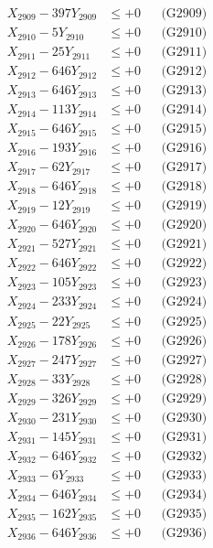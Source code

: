 \documentclass[a4paper,10pt]{article}
\begin{document}
{\begin{align}
X_{2909} - 397Y_{2909} &\leq +0 && \text{(G2909)} \\
X_{2910} - 5Y_{2910} &\leq +0 && \text{(G2910)} \\
\allowbreak
X_{2911} - 25Y_{2911} &\leq +0 && \text{(G2911)} \\
X_{2912} - 646Y_{2912} &\leq +0 && \text{(G2912)} \\
X_{2913} - 646Y_{2913} &\leq +0 && \text{(G2913)} \\
X_{2914} - 113Y_{2914} &\leq +0 && \text{(G2914)} \\
X_{2915} - 646Y_{2915} &\leq +0 && \text{(G2915)} \\
X_{2916} - 193Y_{2916} &\leq +0 && \text{(G2916)} \\
X_{2917} - 62Y_{2917} &\leq +0 && \text{(G2917)} \\
X_{2918} - 646Y_{2918} &\leq +0 && \text{(G2918)} \\
X_{2919} - 12Y_{2919} &\leq +0 && \text{(G2919)} \\
X_{2920} - 646Y_{2920} &\leq +0 && \text{(G2920)} \\
\allowbreak
X_{2921} - 527Y_{2921} &\leq +0 && \text{(G2921)} \\
X_{2922} - 646Y_{2922} &\leq +0 && \text{(G2922)} \\
X_{2923} - 105Y_{2923} &\leq +0 && \text{(G2923)} \\
X_{2924} - 233Y_{2924} &\leq +0 && \text{(G2924)} \\
X_{2925} - 22Y_{2925} &\leq +0 && \text{(G2925)} \\
X_{2926} - 178Y_{2926} &\leq +0 && \text{(G2926)} \\
X_{2927} - 247Y_{2927} &\leq +0 && \text{(G2927)} \\
X_{2928} - 33Y_{2928} &\leq +0 && \text{(G2928)} \\
X_{2929} - 326Y_{2929} &\leq +0 && \text{(G2929)} \\
X_{2930} - 231Y_{2930} &\leq +0 && \text{(G2930)} \\
\allowbreak
X_{2931} - 145Y_{2931} &\leq +0 && \text{(G2931)} \\
X_{2932} - 646Y_{2932} &\leq +0 && \text{(G2932)} \\
X_{2933} - 6Y_{2933} &\leq +0 && \text{(G2933)} \\
X_{2934} - 646Y_{2934} &\leq +0 && \text{(G2934)} \\
X_{2935} - 162Y_{2935} &\leq +0 && \text{(G2935)} \\
X_{2936} - 646Y_{2936} &\leq +0 && \text{(G2936)} \\

\end{align}}
\end{document}
